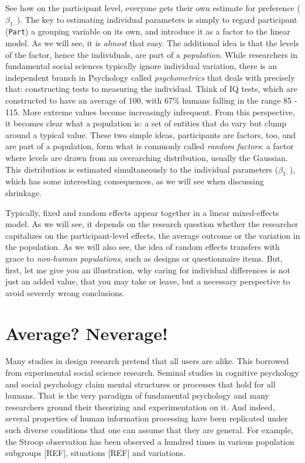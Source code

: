 \documentclass[]{svmono}
\theoremstyle{definition}
\theoremstyle{definition}
\theoremstyle{definition}
\theoremstyle{remark}
\begin{document}
See how on the participant level, everyone gets their own estimate for
preference (\(\beta_{1\cdot}\)). The key to estimating individual
parameters is simply to regard participant (\texttt{Part}) a grouping
variable on its own, and introduce it as a factor to the linear model.
As we will see, it is \emph{almost} that easy. The additional idea is
that the levels of the factor, hence the individuals, are part of a
\emph{population}. While researchers in fundamental social sciences
typically ignore individual variation, there is an independent branch in
Psychology called \emph{psychometrics} that deals with precisely that:
constructing tests to measuring the individual. Think of IQ tests, which
are constructed to have an average of 100, with 67\% humans falling in
the range 85 - 115. More extreme values become increasingly infrequent.
From this perspective, it becomes clear what a population is: a set of
entities that do vary but clump around a typical value. These two simple
ideas, participants are factors, too, and are part of a population, form
what is commonly called \emph{random factors}: a factor where levels are
drawn from an overarching distribution, usually the Gaussian. This
distribution is estimated simultaneously to the individual parameters
(\(\beta_{1\cdot}\)), which has some interesting consequences, as we
will see when discussing shrinkage.

Typically, fixed and random effects appear together in a linear
mixed-effects model. As we will see, it depends on the research question
whether the researcher capitalizes on the participant-level effects, the
average outcome or the variation in the population. As we will also see,
the idea of random effects transfers with grace to \emph{non-human
populations}, such as designs or questionnaire items. But, first, let me
give you an illustration, why caring for individual differences is not
just an added value, that you may take or leave, but a necessary
perspective to avoid severely wrong conclusions.

\section{Average? Neverage!}\label{average-neverage}

Many studies in design research pretend that all users are alike. This
borrowed from experimental social science research. Seminal studies in
cognitive psychology and social psychology claim mental structures or
processes that hold for all humans. That is the very paradigm of
fundamental psychology and many researchers ground their theorizing and
experimentation on it. And indeed, several properties of human
information processing have been replicated under such diverse
conditions that one can assume that they are general. For example, the
Stroop observation has been observed a hundred times in various
population subgroups {[}REF{]}, situations {[}REF{]} and variations.
\end{document}

